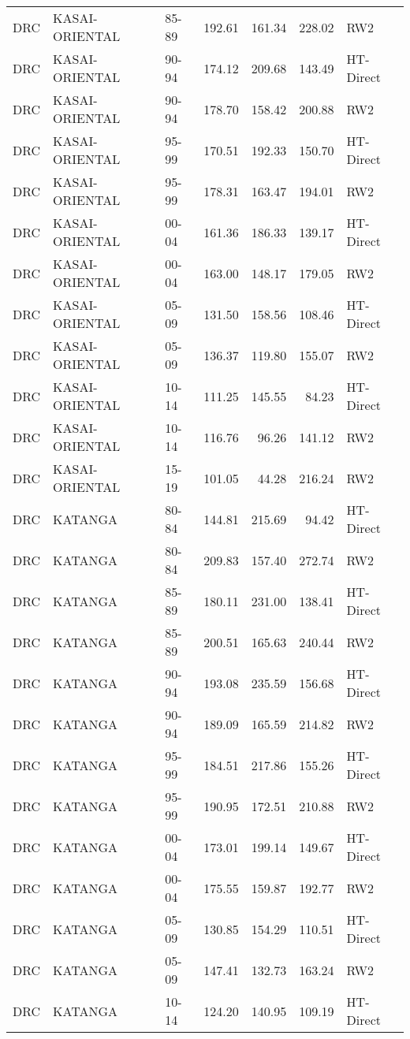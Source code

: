 \begin{longtable}{lllrrrl}
  DRC & KASAI-ORIENTAL & 85-89 & 192.61 & 161.34 & 228.02 & RW2 \\ 
  DRC & KASAI-ORIENTAL & 90-94 & 174.12 & 209.68 & 143.49 & HT-Direct \\ 
  DRC & KASAI-ORIENTAL & 90-94 & 178.70 & 158.42 & 200.88 & RW2 \\ 
  DRC & KASAI-ORIENTAL & 95-99 & 170.51 & 192.33 & 150.70 & HT-Direct \\ 
  DRC & KASAI-ORIENTAL & 95-99 & 178.31 & 163.47 & 194.01 & RW2 \\ 
  DRC & KASAI-ORIENTAL & 00-04 & 161.36 & 186.33 & 139.17 & HT-Direct \\ 
  DRC & KASAI-ORIENTAL & 00-04 & 163.00 & 148.17 & 179.05 & RW2 \\ 
  DRC & KASAI-ORIENTAL & 05-09 & 131.50 & 158.56 & 108.46 & HT-Direct \\ 
  DRC & KASAI-ORIENTAL & 05-09 & 136.37 & 119.80 & 155.07 & RW2 \\ 
  DRC & KASAI-ORIENTAL & 10-14 & 111.25 & 145.55 & 84.23 & HT-Direct \\ 
  DRC & KASAI-ORIENTAL & 10-14 & 116.76 & 96.26 & 141.12 & RW2 \\ 
  DRC & KASAI-ORIENTAL & 15-19 & 101.05 & 44.28 & 216.24 & RW2 \\ 
  DRC & KATANGA & 80-84 & 144.81 & 215.69 & 94.42 & HT-Direct \\ 
  DRC & KATANGA & 80-84 & 209.83 & 157.40 & 272.74 & RW2 \\ 
  DRC & KATANGA & 85-89 & 180.11 & 231.00 & 138.41 & HT-Direct \\ 
  DRC & KATANGA & 85-89 & 200.51 & 165.63 & 240.44 & RW2 \\ 
  DRC & KATANGA & 90-94 & 193.08 & 235.59 & 156.68 & HT-Direct \\ 
  DRC & KATANGA & 90-94 & 189.09 & 165.59 & 214.82 & RW2 \\ 
  DRC & KATANGA & 95-99 & 184.51 & 217.86 & 155.26 & HT-Direct \\ 
  DRC & KATANGA & 95-99 & 190.95 & 172.51 & 210.88 & RW2 \\ 
  DRC & KATANGA & 00-04 & 173.01 & 199.14 & 149.67 & HT-Direct \\ 
  DRC & KATANGA & 00-04 & 175.55 & 159.87 & 192.77 & RW2 \\ 
  DRC & KATANGA & 05-09 & 130.85 & 154.29 & 110.51 & HT-Direct \\ 
  DRC & KATANGA & 05-09 & 147.41 & 132.73 & 163.24 & RW2 \\ 
  DRC & KATANGA & 10-14 & 124.20 & 140.95 & 109.19 & HT-Direct \\ 

\end{longtable}
